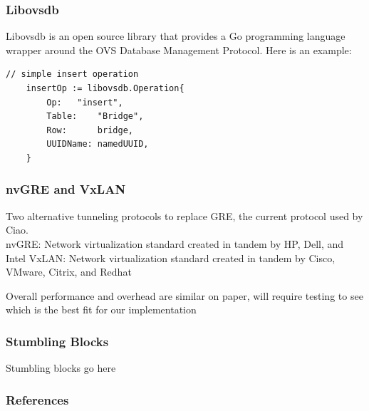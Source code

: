 \documentclass[pdf]{beamer}
\begin{document}
\begin{frame}[fragile]
	\frametitle{Libovsdb}
	Libovsdb is an open source library that provides a Go programming
	language wrapper around the OVS Database Management Protocol. Here is
	an example:\cite{gosample} \\

\begin{lstlisting}[caption=Example insert operation using libovsdb]
	// simple insert operation
	insertOp := libovsdb.Operation{
	    Op:	  "insert",
	    Table:	  "Bridge",
	    Row:	  bridge,
	    UUIDName: namedUUID,
	}

\end{lstlisting}
\end{frame}
\begin{frame}
	\frametitle{nvGRE and VxLAN}
	Two alternative tunneling protocols to replace GRE, the current
	protocol used by Ciao.\\
	nvGRE: Network virtualization standard created in tandem by HP, Dell,
	and Intel
	VxLAN: Network virtualization standard created in tandem by Cisco,
	VMware, Citrix, and Redhat

	Overall performance and overhead are similar on paper, will require
	testing to see which is the best fit for our implementation
\end{frame}
\begin{frame}
	\frametitle{Stumbling Blocks}
	Stumbling blocks go here
\end{frame}

\begin{frame}
\end{frame}
\begin{frame}
	\frametitle{References}
		
		
	\end{frame}
\end{document}
